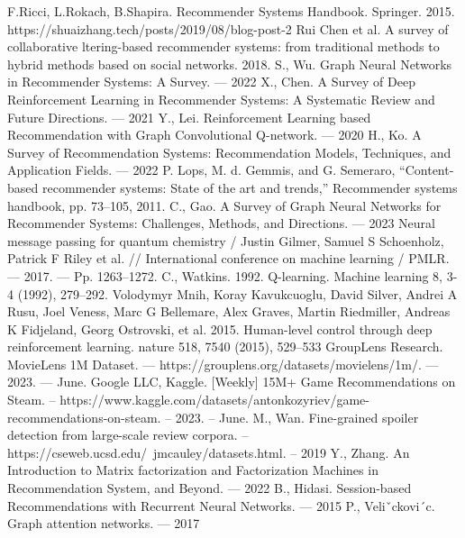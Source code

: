 \documentclass[a4paper,14pt,oneside]{mipt-thesis-ms}
\begin{document}
\begin{thebibliography}{99}
        F.Ricci, L.Rokach, B.Shapira. Recommender Systems Handbook. Springer. 2015.
https://shuaizhang.tech/posts/2019/08/blog-post-2
        Rui Chen et al. A survey of collaborative ltering-based recommender systems: from traditional methods to hybrid methods based on social networks. 2018.
        S., Wu. Graph Neural Networks in Recommender Systems: A Survey. — 2022
        X., Chen. A Survey of Deep Reinforcement Learning in Recommender Systems: A Systematic Review and Future Directions. — 2021
        Y., Lei. Reinforcement Learning based Recommendation with Graph Convolutional Q-network. — 2020
        H., Ko. A Survey of Recommendation Systems: Recommendation Models, Techniques, and Application Fields. — 2022    
        P. Lops, M. d. Gemmis, and G. Semeraro, “Content-based recommender systems: State of the art and trends,”
Recommender systems handbook, pp. 73–105, 2011.
        C., Gao. A Survey of Graph Neural Networks for Recommender Systems: Challenges, Methods, and Directions. — 2023
        Neural message passing for quantum chemistry / Justin Gilmer,
Samuel S Schoenholz, Patrick F Riley et al. // International conference
on machine learning / PMLR. — 2017. — Pp. 1263–1272.
        C., Watkins. 1992. Q-learning. Machine learning 8, 3-4 (1992), 279–292.
        Volodymyr Mnih, Koray Kavukcuoglu, David Silver, Andrei A Rusu, Joel Veness, Marc G Bellemare, Alex Graves,
Martin Riedmiller, Andreas K Fidjeland, Georg Ostrovski, et al. 2015. Human-level control through deep reinforcement
learning. nature 518, 7540 (2015), 529–533
        GroupLens Research. MovieLens 1M Dataset. — https://grouplens.org/datasets/movielens/1m/. — 2023. — June.
        Google LLC, Kaggle. [Weekly] 15M+ Game Recommendations on Steam. -- https://www.kaggle.com/datasets/antonkozyriev/game-recommendations-on-steam. -- 2023. -- June.
        M., Wan. Fine-grained spoiler detection from large-scale review corpora. -- https://cseweb.ucsd.edu/~jmcauley/datasets.html. -- 2019
        Y., Zhang. An Introduction to Matrix factorization and Factorization Machines in Recommendation System, and Beyond. — 2022
        B., Hidasi. Session-based Recommendations with Recurrent Neural Networks. — 2015
        P., Veliˇckovi´c. Graph attention networks. — 2017
    
        
\end{thebibliography}
\end{document}
